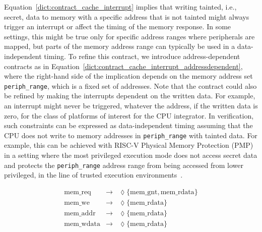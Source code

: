 Equation~\ref{dict:contract_cache_interrupt} implies that writing tainted, i.e., secret, data to memory with a specific address that is not tainted might always trigger an interrupt or affect the timing of the memory response. In some settings, this might be true only for specific address ranges where peripherals are mapped, but parts of the memory address range can typically be used in a data-independent timing.
To refine this contract, we introduce address-dependent contracts as in Equation~\ref{dict:contract_cache_interrupt_addressdependent}, where the right-hand side of the implication depends on the memory address set \texttt{periph\_range}, which is a fixed set of addresses.
Note that the contract could also be refined by making the interrupts dependent on the written data. For example, an interrupt might never be triggered, whatever the address, if the written data is zero, for the class of platforms of interest for the CPU integrator.
In verification, such constraints can be expressed as data-independent timing assuming that the CPU does not write to memory addresses in \texttt{periph\_range} with tainted data.
For example, this can be achieved with RISC-V Physical Memory Protection (PMP)~\cite{riscv_privileged} in a setting where the most privileged execution mode does not access secret data and protects the \texttt{periph\_range} address range from being accessed from lower privileged, in the line of trusted execution environments~\cite{lee2019keystone,costan2016sanctum,mckeen2013intel,arm2009trustzone,nasahl2020hector,mcgillion2015opentee,lebedev2018sanctorum,schneider2022sok,bourgeat2018mi6,brasser2022tcx}.

\begin{equation}
\label{dict:contract_nocache}
\begin{array}{rcl}
\text{mem\_req} & \rightarrow & \lozenge \{ \text{mem\_gnt}, \text{mem\_rdata}\} \\
\text{mem\_we} & \rightarrow & \lozenge \{\text{mem\_rdata}\} \\
\text{mem\_addr} & \rightarrow & \lozenge \{ \text{mem\_rdata}\} \\
\text{mem\_wdata} & \rightarrow & \lozenge \{ \text{mem\_rdata} \} \\
\end{array}
\end{equation}


